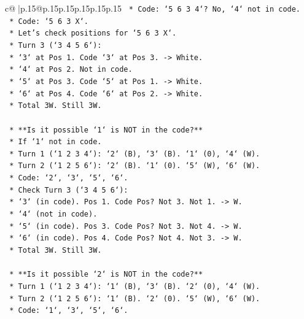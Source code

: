 \documentclass{article}
\begin{document}
{\begin{supertabular}{c@{$\;$}|p{.15\linewidth}@{}p{.15\linewidth}p{.15\linewidth}p{.15\linewidth}p{.15\linewidth}p{.15\linewidth}}
{{{\texttt{                *   Code: `5 6 3 4`? No, `4` not in code.} \\
\texttt{                *   Code: `5 6 3 X`.} \\
\texttt{                *   Let's check positions for `5 6 3 X`.} \\
\texttt{                *   Turn 3 (`3 4 5 6`):} \\
\texttt{                    *   `3` at Pos 1. Code `3` at Pos 3. {-}> White.} \\
\texttt{                    *   `4` at Pos 2. Not in code.} \\
\texttt{                    *   `5` at Pos 3. Code `5` at Pos 1. {-}> White.} \\
\texttt{                    *   `6` at Pos 4. Code `6` at Pos 2. {-}> White.} \\
\texttt{                    *   Total 3W. Still 3W.} \\
\\ 
\texttt{    *   **Is it possible `1` is NOT in the code?**} \\
\texttt{        *   If `1` not in code.} \\
\texttt{        *   Turn 1 (`1 2 3 4`): `2` (B), `3` (B). `1` (0), `4` (W).} \\
\texttt{        *   Turn 2 (`1 2 5 6`): `2` (B). `1` (0). `5` (W), `6` (W).} \\
\texttt{        *   Code: `2`, `3`, `5`, `6`.} \\
\texttt{        *   Check Turn 3 (`3 4 5 6`):} \\
\texttt{            *   `3` (in code). Pos 1. Code Pos? Not 3. Not 1. {-}> W.} \\
\texttt{            *   `4` (not in code).} \\
\texttt{            *   `5` (in code). Pos 3. Code Pos? Not 3. Not 4. {-}> W.} \\
\texttt{            *   `6` (in code). Pos 4. Code Pos? Not 4. Not 3. {-}> W.} \\
\texttt{            *   Total 3W. Still 3W.} \\
\\ 
\texttt{    *   **Is it possible `2` is NOT in the code?**} \\
\texttt{        *   Turn 1 (`1 2 3 4`): `1` (B), `3` (B). `2` (0), `4` (W).} \\
\texttt{        *   Turn 2 (`1 2 5 6`): `1` (B). `2` (0). `5` (W), `6` (W).} \\
\texttt{        *   Code: `1`, `3`, `5`, `6`.} \\
}}}
\end{supertabular}}
\end{document}
